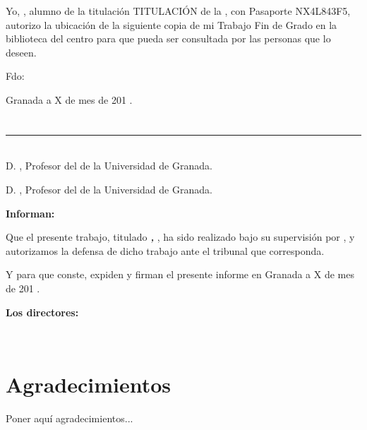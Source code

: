 Yo, \textbf{\myName}, alumno de la titulación TITULACIÓN de la \textbf{\myFaculty}, 
con Pasaporte NX4L843F5, autorizo la ubicación de la siguiente copia de mi 
Trabajo Fin de Grado en la biblioteca del centro para que pueda ser
consultada por las personas que lo deseen.

\vspace{6cm}

\noindent Fdo: \myName

\vspace{2cm}

\begin{flushright}
Granada a X de mes de 201 .
\end{flushright}


\chapter*{}
\thispagestyle{empty}

\noindent\rule[-1ex]{\textwidth}{2pt}\\[4.5ex]

D. \textbf{\myProf}, Profesor del \myDepartment de la Universidad de Granada.

\vspace{0.5cm}

D. \textbf{\myOtherProf}, Profesor del \myDepartment de la Universidad de Granada.


\vspace{0.5cm}

\textbf{Informan:}

\vspace{0.5cm}

Que el presente trabajo, titulado \textit{\textbf{\myTitle, \mySubTitle}},
ha sido realizado bajo su supervisión por \textbf{\myName}, y autorizamos la defensa de dicho trabajo ante el tribunal
que corresponda.

\vspace{0.5cm}

Y para que conste, expiden y firman el presente informe en Granada a X de mes de 201 .

\vspace{1cm}

\textbf{Los directores:}

\vspace{5cm}

\noindent \textbf{\myProf \ \ \ \ \ \myOtherProf}

\chapter*{Agradecimientos}

\thispagestyle{empty}
       \vspace{1cm}


Poner aquí agradecimientos...
